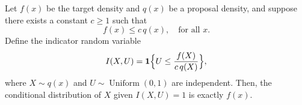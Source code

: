 \documentclass[10pt, headings=standardclasses, parskip=half, twoside]{scrartcl}
\begin{document}
\begin{center}
\end{center}




\begin{theorem}\label{thm:rej}
Let \(f(x)\) be the target density and \(q(x)\) be a proposal density, and suppose there exists a constant \(c\ge 1\) such that
\[
f(x)\le c\,q(x),\quad \text{for all } x.
\]
Define the indicator random variable
\[
I(X,U)=\mathbf{1}\Bigl\{U\le \frac{f(X)}{c\,q(X)}\Bigr\},
\]
where \(X\sim q(x)\) and \(U\sim \operatorname{Uniform}(0,1)\) are independent. Then, the conditional distribution of \(X\) given \(I(X,U)=1\) is exactly \(f(x)\).
\end{theorem}
\end{document}
